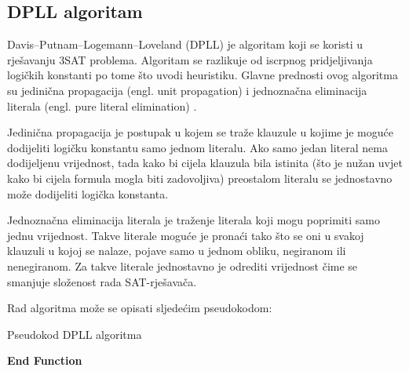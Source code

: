 \documentclass[hidelinks, conference]{IEEEtran}
\begin{document}
\subsection{DPLL algoritam}\label{AA}
Davis–Putnam–Logemann–Loveland (DPLL) je algoritam koji se koristi u rješavanju 3SAT problema. Algoritam se razlikuje od iscrpnog pridjeljivanja logičkih konstanti po tome što uvodi heuristiku. Glavne prednosti ovog algoritma su jedinična propagacija (engl. unit propagation) i jednoznačna eliminacija literala (engl. pure literal elimination) \cite{b2}.

Jedinična propagacija je postupak u kojem se traže klauzule u kojime je moguće dodijeliti logičku konstantu samo jednom literalu. Ako samo jedan literal nema dodijeljenu vrijednost, tada kako bi cijela klauzula bila istinita (što je nužan uvjet kako bi cijela formula mogla biti zadovoljiva) preostalom literalu se jednostavno može dodijeliti logička konstanta.

Jednoznačna eliminacija literala je traženje literala koji mogu poprimiti samo jednu vrijednost. Takve literale moguće je pronaći tako što se oni u svakoj klauzuli u kojoj se nalaze, pojave samo u jednom obliku, negiranom ili nenegiranom. Za takve literale jednostavno je odrediti vrijednost čime se smanjuje složenost rada SAT-rješavača.

Rad algoritma može se opisati sljedećim pseudokodom:

\begin{algorithm}
\caption{Pseudokod DPLL algoritma}\label{alg:one}
\textbf{\newline End Function}
\newline
\end{algorithm}
\end{document}
